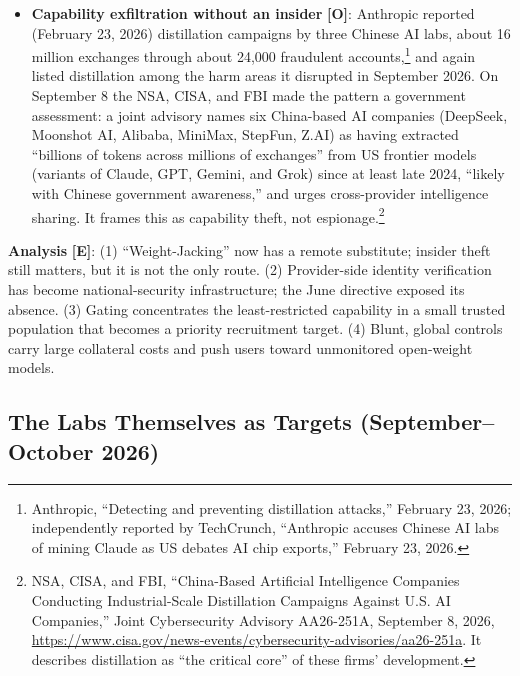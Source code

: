 \documentclass[11pt,letterpaper]{article}
\begin{document}
\begin{itemize}
  \item \textbf{Capability exfiltration without an insider} \textbf{[O]}: Anthropic reported (February 23, 2026) distillation campaigns by three Chinese AI labs, about 16 million exchanges through about 24,000 fraudulent accounts,\footnote{Anthropic, ``Detecting and preventing distillation attacks,'' February 23, 2026; independently reported by TechCrunch, ``Anthropic accuses Chinese AI labs of mining Claude as US debates AI chip exports,'' February 23, 2026.} and again listed distillation among the harm areas it disrupted in September 2026. On September 8 the NSA, CISA, and FBI made the pattern a government assessment: a joint advisory names six China-based AI companies (DeepSeek, Moonshot AI, Alibaba, MiniMax, StepFun, Z.AI) as having extracted ``billions of tokens across millions of exchanges'' from US frontier models (variants of Claude, GPT, Gemini, and Grok) since at least late 2024, ``likely with Chinese government awareness,'' and urges cross-provider intelligence sharing. It frames this as capability theft, not espionage.\footnote{NSA, CISA, and FBI, ``China-Based Artificial Intelligence Companies Conducting Industrial-Scale Distillation Campaigns Against U.S. AI Companies,'' Joint Cybersecurity Advisory AA26-251A, September 8, 2026, \url{https://www.cisa.gov/news-events/cybersecurity-advisories/aa26-251a}. It describes distillation as ``the critical core'' of these firms' development.}
\end{itemize}

\textbf{Analysis} \textbf{[E]}: (1) ``Weight-Jacking'' now has a remote substitute; insider theft still matters, but it is not the only route. (2) Provider-side identity verification has become national-security infrastructure; the June directive exposed its absence. (3) Gating concentrates the least-restricted capability in a small trusted population that becomes a priority recruitment target. (4) Blunt, global controls carry large collateral costs and push users toward unmonitored open-weight models.

\subsection{The Labs Themselves as Targets (September--October 2026)}\label{sec:labtargets}
\end{document}
